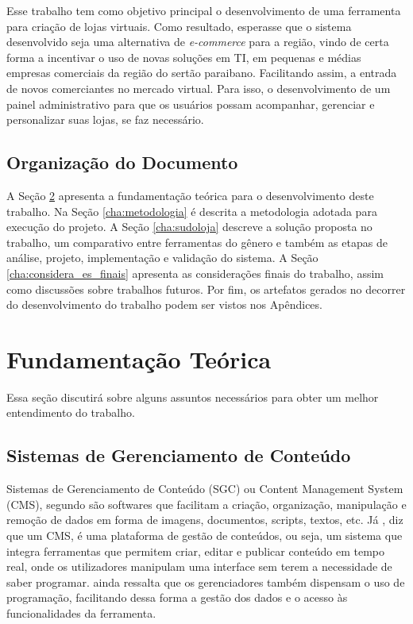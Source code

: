 \documentclass[a4paper,12pt]{monografia}
\begin{document}
Esse trabalho tem como objetivo principal o desenvolvimento de uma ferramenta para criação de lojas virtuais. Como resultado, esperasse que o sistema desenvolvido seja uma alternativa de \textit{e-commerce} para a região, vindo de certa forma a incentivar o uso de novas soluções em TI, em pequenas e médias empresas comerciais da região do sertão paraibano. Facilitando assim, a entrada de novos comerciantes no mercado virtual. Para isso, o desenvolvimento de um painel administrativo para que os usuários possam acompanhar, gerenciar e personalizar suas lojas, se faz necessário. 



\section{Organização do Documento} %
\label{sec:organizacao_do_documento}

A Seção \ref{cha:fundamentaco_teorica} apresenta a fundamentação teórica para o desenvolvimento deste trabalho. Na Seção \ref{cha:metodologia} é descrita a metodologia adotada para execução do projeto. A Seção \ref{cha:sudoloja} descreve a solução proposta no trabalho, um comparativo entre ferramentas do gênero e também as etapas de análise, projeto, implementação e validação do sistema. A Seção \ref{cha:considera_es_finais} apresenta as considerações finais do trabalho, assim como discussões sobre trabalhos futuros. Por fim, os artefatos gerados no decorrer do desenvolvimento do trabalho podem ser vistos nos Apêndices.

\chapter{Fundamentação Teórica} %
\label{cha:fundamentaco_teorica}

Essa seção discutirá sobre alguns assuntos necessários para obter um melhor entendimento do trabalho.

\section{Sistemas de Gerenciamento de Conteúdo} %
\label{sec:cms}

Sistemas de Gerenciamento de Conteúdo (SGC) ou Content Management System (CMS), segundo  são softwares que facilitam a criação, organização, manipulação e remoção de dados em forma de imagens, documentos, scripts, textos, etc.
Já , diz que um CMS, é uma plataforma de gestão de conteúdos, ou seja, um sistema que integra ferramentas que permitem criar, editar e publicar conteúdo em tempo real, onde os utilizadores manipulam uma interface sem terem a necessidade de saber programar.  ainda ressalta que os gerenciadores também dispensam o uso de programação, facilitando dessa forma a gestão dos dados e o acesso às funcionalidades da ferramenta.
\end{document}
